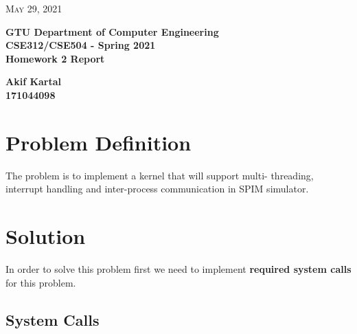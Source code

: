 \documentclass{article}
\begin{document}
\begin{titlepage}

	\begin{flushright}
	\textsc{\large May 29, 2021} \\
	\end{flushright}
	\begin{center}
	\Large{\bfseries GTU Department of Computer Engineering \\ CSE312/CSE504 - Spring 2021 \\ Homework 2 Report  } \\
	\end{center}
	\vspace*{\fill}
	\begin{center}
	\Large{\bfseries Akif Kartal \\ 171044098 }
	\end{center}
	\vspace*{\fill}

\end{titlepage}

\cleardoublepage
\section{Problem Definition}
The problem is to implement a kernel that will support multi- threading, interrupt handling and inter-process
communication in SPIM simulator.

\section{Solution}
In order to solve this problem first we need to implement\textbf{ required system calls} for this problem. 

\subsection{System Calls}
\end{document}
